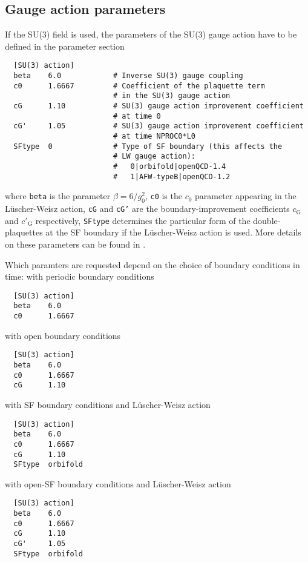 \documentclass[11pt,fleqn]{article}
\begin{document}
\subsection{Gauge action parameters}
\label{subsec:actions:gaugeparms}


If the SU(3) field is used, the parameters of the SU(3) gauge action have to be
defined in the parameter section
%
\begin{verbatim}
  [SU(3) action]
  beta    6.0            # Inverse SU(3) gauge coupling
  c0      1.6667         # Coefficient of the plaquette term
                         # in the SU(3) gauge action
  cG      1.10           # SU(3) gauge action improvement coefficient
                         # at time 0
  cG'     1.05           # SU(3) gauge action improvement coefficient
                         # at time NPROC0*L0
  SFtype  0              # Type of SF boundary (this affects the
                         # LW gauge action):
                         #   0|orbifold|openQCD-1.4
                         #   1|AFW-typeB|openQCD-1.2
\end{verbatim}
%
where \texttt{beta} is the parameter $\beta = 6/g_0^2$, \texttt{c0} is the $c_0$
parameter appearing in the L\"uscher-Weisz action, \texttt{cG} and \texttt{cG'}
are the boundary-improvement coefficients $c_\text{G}$ and $c'_\text{G}$
respectively, \texttt{SFtype} determines the particular form of the
double-plaquettes at the SF boundary if the L\"uscher-Weisz action is used. More
details on these parameters can be found in \cite{gauge_action}.

Which paramters are requested depend on the choice of boundary conditions in
time: with periodic boundary conditions
%
\begin{verbatim}
  [SU(3) action]
  beta    6.0
  c0      1.6667
\end{verbatim}
%
with open boundary conditions
%
\begin{verbatim}
  [SU(3) action]
  beta    6.0
  c0      1.6667
  cG      1.10    
\end{verbatim}
%
with SF boundary conditions and L\"uscher-Weisz action
%
\begin{verbatim}
  [SU(3) action]
  beta    6.0
  c0      1.6667
  cG      1.10
  SFtype  orbifold
\end{verbatim}
%
with open-SF boundary conditions and L\"uscher-Weisz action
%
\begin{verbatim}
  [SU(3) action]
  beta    6.0
  c0      1.6667
  cG      1.10
  cG'     1.05
  SFtype  orbifold
\end{verbatim}
\end{document}
